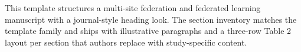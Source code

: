
This template structures a multi-site federation and federated learning manuscript with a journal-style heading look. The section inventory matches the template family and ships with illustrative paragraphs and a three-row Table 2 layout per section that authors replace with study-specific content.

